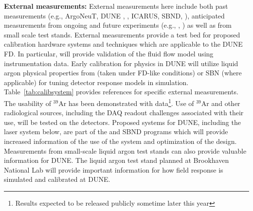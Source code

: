 \textbf{External measurements:} External measurements here include both past measurements (e.g., ArgoNeuT, DUNE , , ICARUS, SBND, \lariat), anticipated measurements from ongoing and future experiments (e.g., , ) as well as from small scale  test stands. External measurements provide a test bed for proposed calibration hardware systems and techniques which are applicable to the DUNE FD. In particular,  will provide validation of the fluid flow model using instrumentation data. Early calibration for physics in DUNE will utilize liquid argon physical properties from  (taken under FD-like conditions) or SBN (where applicable) for tuning detector response models in simulation. Table~\ref{tab:calibsystem} provides  references for specific external measurements. The usability of ${}^{39}$Ar has been demonstrated with \microboone data\footnote{Results expected to be released publicly sometime later this year}. Use of  ${}^{39}$Ar  and other radiological sources, including the DAQ readout challenges associated with their use, will be tested on the    detectors. Proposed systems for DUNE, including the laser system below, are part of the \microboone and SBND programs which will provide increased information of the use of the system and optimization of the design. Measurements from small-scale liquid argon test stands can also provide valuable information for DUNE. The liquid argon test stand planned at Brookhaven National Lab will provide important information for how field response is simulated and calibrated at DUNE.




